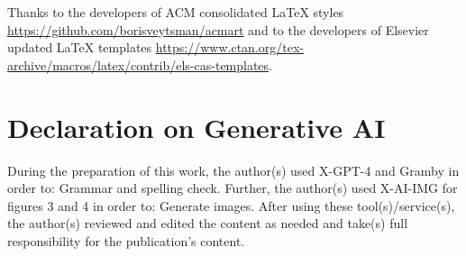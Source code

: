 \documentclass[
]{ceurart}
\begin{document}
\maketitle








%  
%  

\begin{acknowledgments}
  Thanks to the developers of ACM consolidated LaTeX styles
  \url{https://github.com/borisveytsman/acmart} and to the developers
  of Elsevier updated \LaTeX{} templates
  \url{https://www.ctan.org/tex-archive/macros/latex/contrib/els-cas-templates}.  
\end{acknowledgments}

\section*{Declaration on Generative AI}
 
 During the preparation of this work, the author(s) used X-GPT-4 and Gramby in order to: Grammar and spelling check. Further, the author(s) used X-AI-IMG for figures 3 and 4 in order to: Generate images. After using these tool(s)/service(s), the author(s) reviewed and edited the content as needed and take(s) full responsibility for the publication’s content. 
\end{document}
